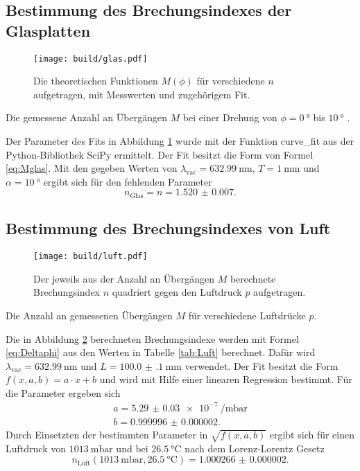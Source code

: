 \subsection{Bestimmung des Brechungsindexes der Glasplatten}
\label{ssec:glas}
\begin{figure}
	\centering
	\texttt{[image: build/glas.pdf]}
	\caption{Die theoretischen Funktionen $M(\phi)$ für verschiedene $n$ aufgetragen, mit Messwerten und zugehörigem Fit.}
	\label{fig:Glas}
\end{figure}
\begin{table}
	\centering
	\caption{Die gemessene Anzahl an Übergängen $M$ bei einer Drehung von $\phi=\SI{0}{\degree}$ bis $\SI{10}{\degree}$ .}
	
\end{table}
Der Parameter des Fits in Abbildung \ref{fig:Glas} wurde mit der Funktion curve\_fit aus der Python-Bibliothek SciPy \cite{scipy} ermittelt. Der Fit besitzt die Form von Formel \eqref{eq:Mglas}. Mit den gegeben Werten von $\lambda_\text{vac}=\SI{632.99}{\nano\meter}$, $T=\SI{1}{\milli\meter}$ und $\alpha=\SI{10}{\degree}$ ergibt sich für den fehlenden Parameter
\begin{displaymath}
	n_\text{Glas}=n=\num{1.520(7)}.
\end{displaymath}

\subsection{Bestimmung des Brechungsindexes von Luft}
\label{ssec:luft}
\begin{figure}
	\centering
	\texttt{[image: build/luft.pdf]}
	\caption{Der jeweils aus der Anzahl an Übergängen $M$ berechnete Brechungsindex $n$ quadriert gegen den Luftdruck $p$ aufgetragen.}
	\label{fig:Luft}
\end{figure}
\begin{table}
	\centering
	\caption{Die Anzahl an gemessenen Übergängen $M$ für verschiedene Luftdrücke $p$.}
	
\end{table}
Die in Abbildung \ref{fig:Luft} berechneten Brechungsindexe werden mit Formel \eqref{eq:Deltaphi} aus den Werten in Tabelle \ref{tab:Luft} berechnet. Dafür wird $\lambda_\text{vac}=\SI{632.99}{\nano\meter}$ und $L=\SI{100.0(1)}{\milli\meter}$ \cite{V64} verwendet. Der Fit besitzt die Form $f(x,a,b) =a\cdot x +b$ und wird mit Hilfe einer linearen Regression bestimmt. Für die Parameter ergeben sich
\begin{gather*}
	a=\SI{5.29(3)e-7}{\per\milli\bar}\\
	b=\num{0.999996(2)}.
\end{gather*}
Durch Einsetzten der bestimmten Parameter in $\sqrt{f(x,a,b)}$ ergibt sich für einen Luftdruck von $\SI{1013}{\milli\bar}$ und bei $\SI{26.5}{\degreeCelsius}$ nach dem Lorenz-Lorentz Gesetz
\begin{displaymath}
 n_\text{Luft}(\SI{1013}{\milli\bar},\SI{26.5}{\degreeCelsius})=\num{1.000266(2)}.
\end{displaymath}